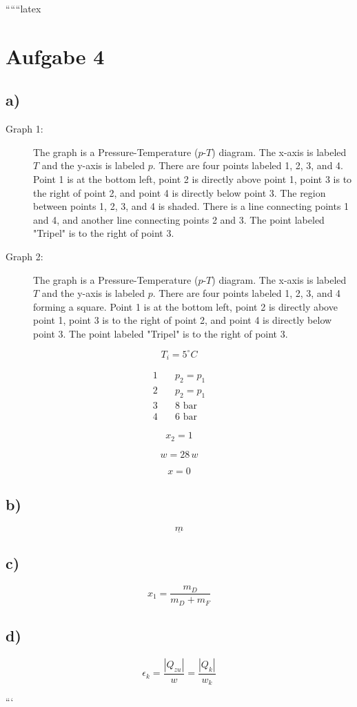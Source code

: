 
``````latex


\section*{Aufgabe 4}

\subsection*{a)}

\begin{description}
    \item[Graph 1:] 
    The graph is a Pressure-Temperature ($p$-$T$) diagram. The x-axis is labeled $T$ and the y-axis is labeled $p$. There are four points labeled 1, 2, 3, and 4. Point 1 is at the bottom left, point 2 is directly above point 1, point 3 is to the right of point 2, and point 4 is directly below point 3. The region between points 1, 2, 3, and 4 is shaded. There is a line connecting points 1 and 4, and another line connecting points 2 and 3. The point labeled "Tripel" is to the right of point 3.
    
    \item[Graph 2:] 
    The graph is a Pressure-Temperature ($p$-$T$) diagram. The x-axis is labeled $T$ and the y-axis is labeled $p$. There are four points labeled 1, 2, 3, and 4 forming a square. Point 1 is at the bottom left, point 2 is directly above point 1, point 3 is to the right of point 2, and point 4 is directly below point 3. The point labeled "Tripel" is to the right of point 3.
\end{description}

\[
T_i = 5^\circ C
\]

\begin{align*}
1 & \quad p_{2} = p_{1} \\
2 & \quad p_{2} = p_{1} \\
3 & \quad 8 \text{ bar} \\
4 & \quad 6 \text{ bar}
\end{align*}

\[
x_2 = 1
\]

\[
w = 28 \, w
\]

\[
x = 0
\]

\subsection*{b)}

\[
\underline{m}
\]

\subsection*{c)}

\[
x_1 = \frac{m_D}{m_D + m_F}
\]

\subsection*{d)}

\[
\epsilon_k = \frac{|Q_{zu}|}{w} = \frac{|Q_k|}{w_k}
\]

```